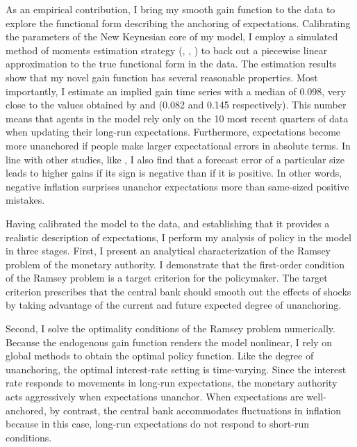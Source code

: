 \documentclass[11pt]{article}
\renewcommand{\[}{\begin{equation}}
\renewcommand{\]}{\end{equation}}
\begin{document}
As an empirical contribution, I bring my smooth gain function to the data to explore the functional form describing the anchoring of expectations. Calibrating the parameters of the New Keynesian core of my model, I employ a simulated method of moments estimation strategy (\cite{duffie1990simulated}, \cite{lee1991simulation}, \cite{smith1993SMM}) to back out a piecewise linear approximation to the true functional form in the data. The estimation results show that my novel gain function has several reasonable properties. Most importantly, I estimate an implied gain time series with a median of 0.098, very close to the values obtained by \cite{milani2014learning} and \cite{carvalho2019anchored} (0.082 and 0.145 respectively). This number means that agents in the model rely only on the 10 most recent quarters of data when updating their long-run expectations. Furthermore, expectations become more unanchored if people make larger expectational errors in absolute terms. In line with other studies, like \cite{hebden2020robust}, I also find that a forecast error of a particular size leads to higher gains if its sign is negative than if it is positive. In other words, negative inflation surprises unanchor expectations more than same-sized positive mistakes.

Having calibrated the model to the data, and establishing that it provides a realistic description of expectations, I perform my analysis of policy in the model in three stages. First, I present an analytical characterization of the Ramsey problem of the monetary authority. I demonstrate that the first-order condition of the Ramsey problem is a target criterion for the policymaker. The target criterion prescribes that the central bank should smooth out the effects of shocks by taking advantage of the current and future expected degree of unanchoring. 

Second, I solve the optimality conditions of the Ramsey problem numerically. Because the endogenous gain function renders the model nonlinear, I rely on global methods to obtain the optimal policy function. Like the degree of unanchoring, the optimal interest-rate setting is time-varying. Since the interest rate responds to movements in long-run expectations, the monetary authority acts aggressively when expectations unanchor. When expectations are well-anchored, by contrast, the central bank accommodates fluctuations in inflation because in this case, long-run expectations do not respond to short-run conditions.
\end{document}
